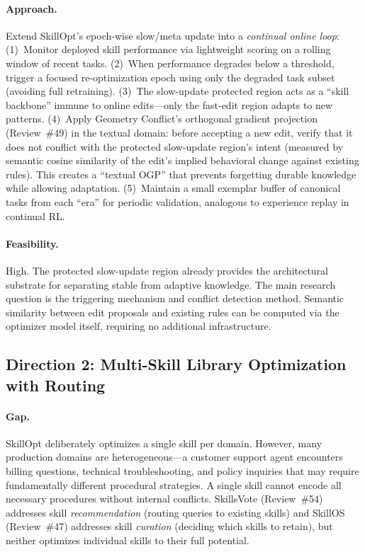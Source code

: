 \documentclass[11pt,a4paper]{article}
\begin{document}
\paragraph{Approach.}
Extend SkillOpt's epoch-wise slow/meta update into a \emph{continual online loop}: (1)~Monitor deployed skill performance via lightweight scoring on a rolling window of recent tasks. (2)~When performance degrades below a threshold, trigger a focused re-optimization epoch using only the degraded task subset (avoiding full retraining). (3)~The slow-update protected region acts as a ``skill backbone'' immune to online edits---only the fast-edit region adapts to new patterns. (4)~Apply Geometry Conflict's orthogonal gradient projection (Review~\#49) in the textual domain: before accepting a new edit, verify that it does not conflict with the protected slow-update region's intent (measured by semantic cosine similarity of the edit's implied behavioral change against existing rules). This creates a ``textual OGP'' that prevents forgetting durable knowledge while allowing adaptation. (5)~Maintain a small exemplar buffer of canonical tasks from each ``era'' for periodic validation, analogous to experience replay in continual RL.

\paragraph{Feasibility.}
High. The protected slow-update region already provides the architectural substrate for separating stable from adaptive knowledge. The main research question is the triggering mechanism and conflict detection method. Semantic similarity between edit proposals and existing rules can be computed via the optimizer model itself, requiring no additional infrastructure.

\subsection*{Direction 2: Multi-Skill Library Optimization with Routing}

\paragraph{Gap.}
SkillOpt deliberately optimizes a single skill per domain. However, many production domains are heterogeneous---a customer support agent encounters billing questions, technical troubleshooting, and policy inquiries that may require fundamentally different procedural strategies. A single skill cannot encode all necessary procedures without internal conflicts. SkillsVote (Review~\#54) addresses skill \emph{recommendation} (routing queries to existing skills) and SkillOS (Review~\#47) addresses skill \emph{curation} (deciding which skills to retain), but neither optimizes individual skills to their full potential.
\end{document}
